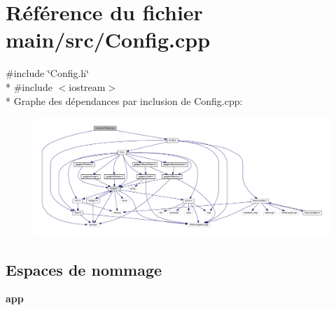 \section{Référence du fichier main/src/\+Config.cpp}
\label{_config_8cpp}
{\ttfamily \#include \char`\"{}Config.\+h\char`\"{}}\\*
{\ttfamily \#include $<$iostream$>$}\\*
Graphe des dépendances par inclusion de Config.\+cpp\+:\nopagebreak
\begin{figure}[H]
\begin{center}
\leavevmode
\includegraphics[width=350pt]{_config_8cpp__incl}
\end{center}
\end{figure}
\subsection*{Espaces de nommage}
\begin{DoxyCompactItemize}
\item 
 {\bf app}
\end{DoxyCompactItemize}
